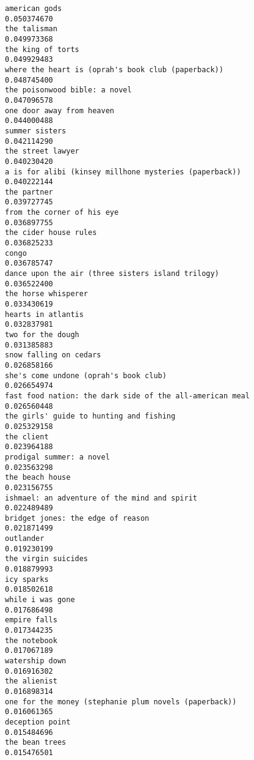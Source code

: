 \documentclass[
]{report}
\begin{document}
\begin{verbatim}
american gods                                               0.050374670
the talisman                                                0.049973368
the king of torts                                           0.049929483
where the heart is (oprah's book club (paperback))          0.048745400
the poisonwood bible: a novel                               0.047096578
one door away from heaven                                   0.044000488
summer sisters                                              0.042114290
the street lawyer                                           0.040230420
a is for alibi (kinsey millhone mysteries (paperback))      0.040222144
the partner                                                 0.039727745
from the corner of his eye                                  0.036897755
the cider house rules                                       0.036825233
congo                                                       0.036785747
dance upon the air (three sisters island trilogy)           0.036522400
the horse whisperer                                         0.033430619
hearts in atlantis                                          0.032837981
two for the dough                                           0.031385883
snow falling on cedars                                      0.026858166
she's come undone (oprah's book club)                       0.026654974
fast food nation: the dark side of the all-american meal    0.026560448
the girls' guide to hunting and fishing                     0.025329158
the client                                                  0.023964188
prodigal summer: a novel                                    0.023563298
the beach house                                             0.023156755
ishmael: an adventure of the mind and spirit                0.022489489
bridget jones: the edge of reason                           0.021871499
outlander                                                   0.019230199
the virgin suicides                                         0.018879993
icy sparks                                                  0.018502618
while i was gone                                            0.017686498
empire falls                                                0.017344235
the notebook                                                0.017067189
watership down                                              0.016916302
the alienist                                                0.016898314
one for the money (stephanie plum novels (paperback))       0.016061365
deception point                                             0.015484696
the bean trees                                              0.015476501

\end{verbatim}
\end{document}
